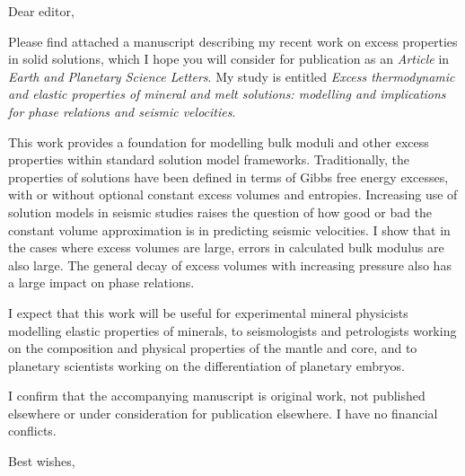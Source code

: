 \documentclass[10pt]{letter}
\date{\today}
\begin{document}
\begin{letter}{}
                           
\opening{Dear editor,}

Please find attached a manuscript describing my recent work on excess properties in solid solutions, which I hope you will consider for publication as an \emph{Article} in \emph{Earth and Planetary Science Letters}. My study is entitled \emph{Excess thermodynamic and elastic properties of mineral and melt solutions: modelling and implications for phase relations and seismic velocities}.


This work provides a foundation for modelling bulk moduli and other excess properties within standard solution model frameworks. Traditionally, the properties of solutions have been defined in terms of Gibbs free energy excesses, with or without optional constant excess volumes and entropies. Increasing use of solution models in seismic studies raises the question of how good or bad the constant volume approximation is in predicting seismic velocities. I show that in the cases where excess volumes are large, errors in calculated bulk modulus are also large. The general decay of excess volumes with increasing pressure also has a large impact on phase relations.

I expect that this work will be useful for experimental mineral physicists modelling elastic properties of minerals, to seismologists and petrologists working on the composition and physical properties of the mantle and core, and to planetary scientists working on the differentiation of planetary embryos. 

I confirm that the accompanying manuscript is original work, not published elsewhere or under consideration for publication elsewhere. I have no financial conflicts. 


\closing{Best wishes,}

\end{letter}
\end{document}
